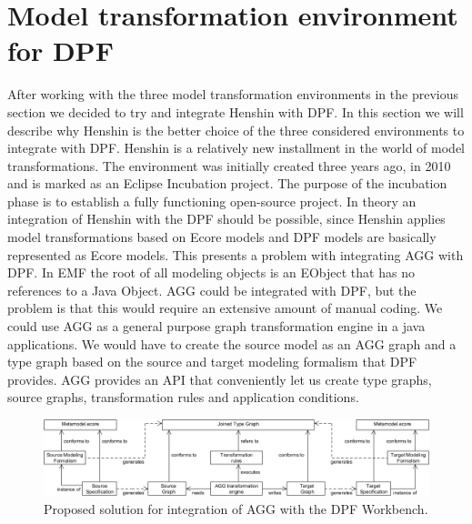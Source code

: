 \section{Model transformation environment for DPF}
\label{tool_choice}

After working with the three model transformation environments in the previous
section we decided to try and integrate Henshin with DPF. In this section we
will describe why Henshin is the better choice of the three considered
environments to integrate with DPF. Henshin\cite{Henshin_2010,Henshin} is a
relatively new installment in the world of model transformations. The
environment was initially created three years ago, in 2010 and is marked as an
Eclipse Incubation project. The purpose of the incubation phase is to establish
a fully functioning open-source project. In theory an integration of Henshin
with the DPF should be possible, since Henshin applies model transformations
based on Ecore models and DPF models are basically represented as Ecore
models. This presents a problem with integrating AGG with DPF. In EMF the root
of all modeling objects is an EObject that has no references to a Java Object. 
AGG could be integrated with DPF, but the problem is that this would
require an extensive amount of manual coding. We could use AGG as a general
purpose graph transformation engine in a java applications. We would have to
create the source model as an AGG graph and a type graph based on the source and
target modeling formalism that DPF provides. AGG provides an API that
conveniently let us create type graphs, source graphs, transformation rules and
application conditions.
 
\begin{figure}[H]
	\centering
	\includegraphics[scale=0.52]{figures/AGG_solution.png}
	\caption[Proposed solution for integration of AGG]
	{Proposed solution for integration of AGG with the DPF Workbench.}
	\label{fig:AGG_Solution}
\end{figure}

